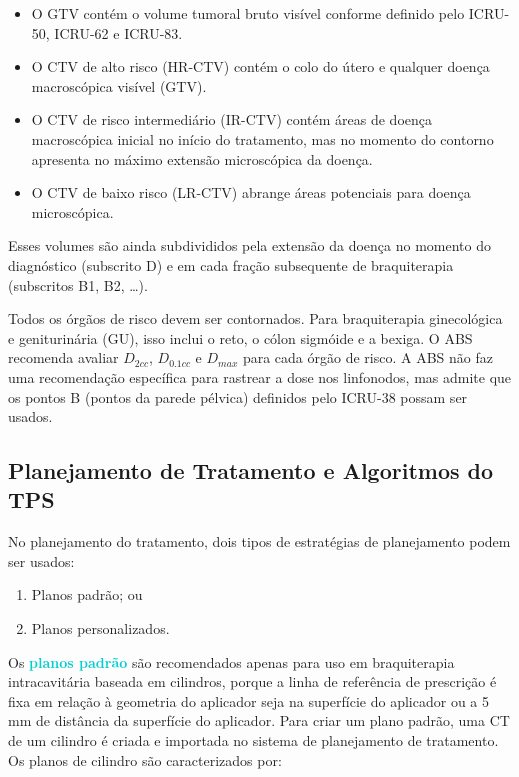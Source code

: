 \documentclass[11pt,a4paper]{article}
\begin{document}
	\begin{itemize}[label=\textcolor{CarnationPink}{$\blacksquare$}]
		\item O GTV contém o volume tumoral bruto visível conforme definido pelo ICRU-50, ICRU-62 e ICRU-83.
		\item O CTV de alto risco (HR-CTV) contém o colo do útero e qualquer doença macroscópica visível (GTV).
		\item O CTV de risco intermediário (IR-CTV) contém áreas de doença macroscópica inicial no início do tratamento, mas no momento do contorno apresenta no máximo extensão microscópica da doença. 
		\item O CTV de baixo risco (LR-CTV) abrange áreas potenciais para doença microscópica.
	\end{itemize}

	Esses volumes são ainda subdivididos pela extensão da doença no momento do diagnóstico (subscrito D) e em cada fração subsequente de braquiterapia (subscritos B1, B2, \dots).

	Todos os órgãos de risco devem ser contornados. Para braquiterapia ginecológica e geniturinária (GU), isso inclui o reto, o cólon sigmóide e a bexiga. O ABS recomenda avaliar $D_{2cc}$, $D_{0.1cc}$ e $D_{max}$ para cada órgão de risco. A ABS não faz uma recomendação específica para rastrear a dose nos linfonodos, mas admite que os pontos B (pontos da parede pélvica) definidos pelo ICRU-38 possam ser usados.

\subsection*{Planejamento de Tratamento e Algoritmos do TPS}

	No planejamento do tratamento, dois tipos de estratégias de planejamento podem ser usados:

	\begin{enumerate}
		\item Planos padrão; ou
		\item Planos personalizados.
	\end{enumerate}

	Os \textcolor{DarkTurquoise}{\textbf{planos padrão}} são recomendados apenas para uso em braquiterapia intracavitária baseada em cilindros, porque a linha de referência de prescrição é fixa em relação à geometria do aplicador seja na superfície do aplicador ou a 5 mm de distância da superfície do aplicador. Para criar um plano padrão, uma CT de um cilindro é criada e importada no sistema de planejamento de tratamento. Os planos de cilindro são caracterizados por:
\end{document}
